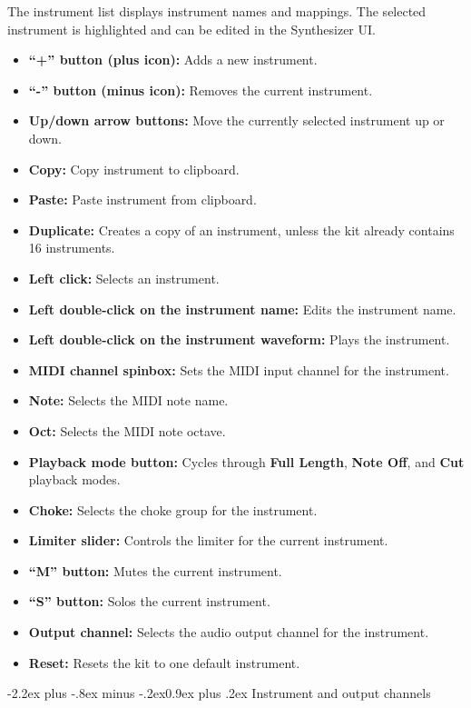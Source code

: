 \documentclass[11pt]{article}
\makeatletter
\providecommand{\tightlist}{%
  \setlength{\itemsep}{0pt}\setlength{\parskip}{0pt}}
\renewcommand{\subsection}{\@startsection{subsection}{2}{\z@}%
  {-2.2ex plus -.8ex minus -.2ex}{0.9ex plus .2ex}%
  {\normalfont\large\bfseries\sffamily\color{GKBlue}}}
\makeatother
\begin{document}
The instrument list displays instrument names and mappings. The selected instrument is highlighted and can be edited in the Synthesizer UI.

\begin{itemize}
\tightlist
\item
  \textbf{``+'' button (plus icon):} Adds a new instrument.
\item
  \textbf{``-'' button (minus icon):} Removes the current instrument.
\item
  \textbf{Up/down arrow buttons:} Move the currently selected instrument
  up or down.
\item
  \textbf{Copy:} Copy instrument to clipboard.
\item
  \textbf{Paste:} Paste instrument from clipboard.
\item
  \textbf{Duplicate:} Creates a copy of an instrument, unless the kit
  already contains 16 instruments.
\item
  \textbf{Left click:} Selects an instrument.
\item
  \textbf{Left double-click on the instrument name:} Edits the
  instrument name.
\item
  \textbf{Left double-click on the instrument waveform:} Plays the
  instrument.
\item
  \textbf{MIDI channel spinbox:} Sets the MIDI input channel for the
  instrument.
\item
  \textbf{Note:} Selects the MIDI note name.
\item
  \textbf{Oct:} Selects the MIDI note octave.
\item
  \textbf{Playback mode button:} Cycles through \textbf{Full Length},
  \textbf{Note Off}, and \textbf{Cut} playback modes.
\item
  \textbf{Choke:} Selects the choke group for the instrument.
\item
  \textbf{Limiter slider:} Controls the limiter for the current
  instrument.
\item
  \textbf{``M'' button:} Mutes the current instrument.
\item
  \textbf{``S'' button:} Solos the current instrument.
\item
  \textbf{Output channel:} Selects the audio output channel for the
  instrument.
\item
  \textbf{Reset:} Resets the kit to one default instrument.
\end{itemize}

\subsection{Instrument and output channels}\label{instrument-output-channels}
\end{document}
